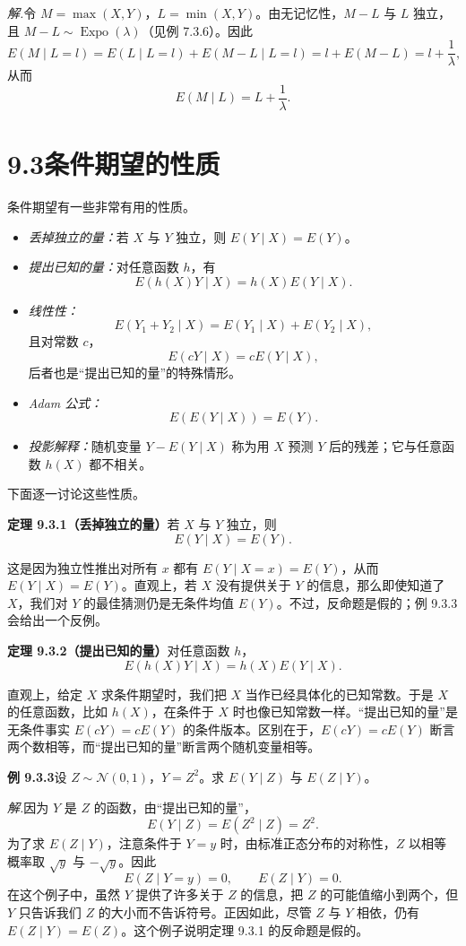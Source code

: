 \documentclass[UTF8,12pt,a4paper,fontset=fandol]{ctexart}
\begin{document}
\noindent\textit{解.}\quad 令 $M=\max(X,Y)$，$L=\min(X,Y)$。由无记忆性，$M-L$ 与 $L$ 独立，且 $M-L\sim\operatorname{Expo}(\lambda)$（见例 7.3.6）。因此
\[
  E(M\mid L=l)=E(L\mid L=l)+E(M-L\mid L=l)
  =l+E(M-L)=l+\frac1\lambda,
\]
从而
\[
  E(M\mid L)=L+\frac1\lambda.
\]

\section*{9.3\quad 条件期望的性质}

条件期望有一些非常有用的性质。

\begin{itemize}
  \item \textit{丢掉独立的量：}若 $X$ 与 $Y$ 独立，则 $E(Y\mid X)=E(Y)$。
  \item \textit{提出已知的量：}对任意函数 $h$，有
  \[
    E(h(X)Y\mid X)=h(X)E(Y\mid X).
  \]
  \item \textit{线性性：}
  \[
    E(Y_1+Y_2\mid X)=E(Y_1\mid X)+E(Y_2\mid X),
  \]
  且对常数 $c$，
  \[
    E(cY\mid X)=cE(Y\mid X),
  \]
  后者也是“提出已知的量”的特殊情形。
  \item \textit{Adam 公式：}
  \[
    E(E(Y\mid X))=E(Y).
  \]
  \item \textit{投影解释：}随机变量 $Y-E(Y\mid X)$ 称为用 $X$ 预测 $Y$ 后的残差；它与任意函数 $h(X)$ 都不相关。
\end{itemize}

下面逐一讨论这些性质。

\noindent\textbf{定理 9.3.1（丢掉独立的量）}\quad 若 $X$ 与 $Y$ 独立，则
\[
  E(Y\mid X)=E(Y).
\]

这是因为独立性推出对所有 $x$ 都有 $E(Y\mid X=x)=E(Y)$，从而 $E(Y\mid X)=E(Y)$。直观上，若 $X$ 没有提供关于 $Y$ 的信息，那么即使知道了 $X$，我们对 $Y$ 的最佳猜测仍是无条件均值 $E(Y)$。不过，反命题是假的；例 9.3.3 会给出一个反例。

\noindent\textbf{定理 9.3.2（提出已知的量）}\quad 对任意函数 $h$，
\[
  E(h(X)Y\mid X)=h(X)E(Y\mid X).
\]

直观上，给定 $X$ 求条件期望时，我们把 $X$ 当作已经具体化的已知常数。于是 $X$ 的任意函数，比如 $h(X)$，在条件于 $X$ 时也像已知常数一样。“提出已知的量”是无条件事实 $E(cY)=cE(Y)$ 的条件版本。区别在于，$E(cY)=cE(Y)$ 断言两个数相等，而“提出已知的量”断言两个随机变量相等。

\noindent\textbf{例 9.3.3}\quad 设 $Z\sim\mathcal N(0,1)$，$Y=Z^2$。求 $E(Y\mid Z)$ 与 $E(Z\mid Y)$。

\noindent\textit{解.}\quad 因为 $Y$ 是 $Z$ 的函数，由“提出已知的量”，
\[
  E(Y\mid Z)=E(Z^2\mid Z)=Z^2.
\]
为了求 $E(Z\mid Y)$，注意条件于 $Y=y$ 时，由标准正态分布的对称性，$Z$ 以相等概率取 $\sqrt y$ 与 $-\sqrt y$。因此
\[
  E(Z\mid Y=y)=0,\qquad E(Z\mid Y)=0.
\]
在这个例子中，虽然 $Y$ 提供了许多关于 $Z$ 的信息，把 $Z$ 的可能值缩小到两个，但 $Y$ 只告诉我们 $Z$ 的大小而不告诉符号。正因如此，尽管 $Z$ 与 $Y$ 相依，仍有 $E(Z\mid Y)=E(Z)$。这个例子说明定理 9.3.1 的反命题是假的。
\end{document}
